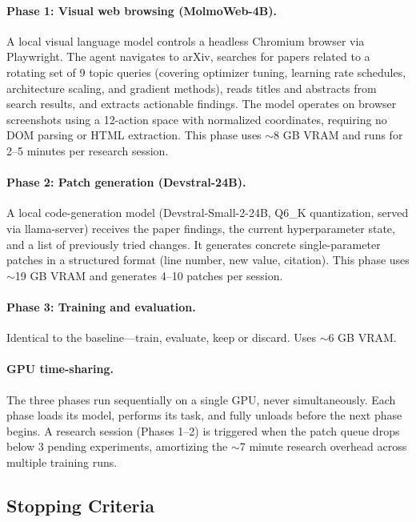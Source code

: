 \documentclass[11pt]{article}
\begin{document}
\paragraph{Phase 1: Visual web browsing (MolmoWeb-4B).}
A local visual language model \citep{deitke2024molmoweb} controls a
headless Chromium browser via Playwright. The agent navigates to arXiv,
searches for papers related to a rotating set of 9 topic queries
(covering optimizer tuning, learning rate schedules, architecture
scaling, and gradient methods), reads titles and abstracts from search
results, and extracts actionable findings. The model operates on
browser screenshots using a 12-action space with normalized
coordinates, requiring no DOM parsing or HTML extraction. This phase
uses $\sim$8 GB VRAM and runs for 2--5 minutes per research session.

\paragraph{Phase 2: Patch generation (Devstral-24B).}
A local code-generation model (Devstral-Small-2-24B, Q6\_K
quantization, served via llama-server) receives the paper findings,
the current hyperparameter state, and a list of previously tried
changes. It generates concrete single-parameter patches in a structured
format (line number, new value, citation). This phase uses $\sim$19 GB
VRAM and generates 4--10 patches per session.

\paragraph{Phase 3: Training and evaluation.}
Identical to the baseline---train, evaluate, keep or discard. Uses
$\sim$6 GB VRAM.

\paragraph{GPU time-sharing.}
The three phases run sequentially on a single GPU, never simultaneously.
Each phase loads its model, performs its task, and fully unloads before
the next phase begins. A research session (Phases 1--2) is triggered
when the patch queue drops below 3 pending experiments, amortizing the
$\sim$7 minute research overhead across multiple training runs.

\subsection{Stopping Criteria}
\label{sec:stopping}
\end{document}
